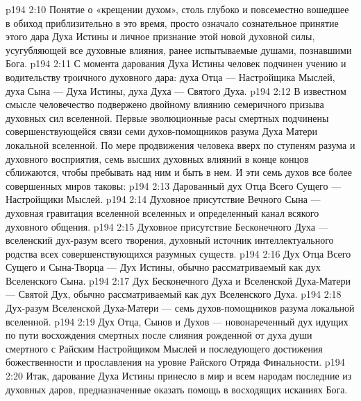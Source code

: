 \vs p194 2:10 \pc Понятие о «крещении духом», столь глубоко и повсеместно вошедшее в обиход приблизительно в это время, просто означало сознательное принятие этого дара Духа Истины и личное признание этой новой духовной силы, усугубляющей все духовные влияния, ранее испытываемые душами, познавшими Бога.
\vs p194 2:11 \pc С момента дарования Духа Истины человек подчинен учению и водительству троичного духовного дара: духа Отца --- Настройщика Мыслей, духа Сына --- Духа Истины, духа Духа --- Святого Духа.
\vs p194 2:12 В известном смысле человечество подвержено двойному влиянию семеричного призыва духовных сил вселенной. Первые эволюционные расы смертных подчинены совершенствующейся связи семи духов\hyp{}помощников разума Духа Матери локальной вселенной. По мере продвижения человека вверх по ступеням разума и духовного восприятия, семь высших духовных влияний в конце концов сближаются, чтобы пребывать над ним и быть в нем. И эти семь духов все более совершенных миров таковы:
\vs p194 2:13 \bibnobreakspace Дарованный дух Отца Всего Сущего --- Настройщики Мыслей.
\vs p194 2:14 \bibnobreakspace Духовное присутствие Вечного Сына --- духовная гравитация вселенной вселенных и определенный канал всякого духовного общения.
\vs p194 2:15 \bibnobreakspace Духовное присутствие Бесконечного Духа --- вселенский дух\hyp{}разум всего творения, духовный источник интеллектуального родства всех совершенствующихся разумных существ.
\vs p194 2:16 \bibnobreakspace Дух Отца Всего Сущего и Сына\hyp{}Творца --- Дух Истины, обычно рассматриваемый как дух Вселенского Сына.
\vs p194 2:17 \bibnobreakspace Дух Бесконечного Духа и Вселенской Духа\hyp{}Матери --- Святой Дух, обычно рассматриваемый как дух Вселенского Духа.
\vs p194 2:18 \bibnobreakspace Дух\hyp{}разум Вселенской Духа\hyp{}Матери --- семь духов\hyp{}помощников разума локальной вселенной.
\vs p194 2:19 \bibnobreakspace Дух Отца, Сынов и Духов --- новонареченный дух идущих по пути восхождения смертных после слияния рожденной от духа души смертного с Райским Настройщиком Мыслей и последующего достижения божественности и прославления на уровне Райского Отряда Финальности.
\vs p194 2:20 \pc Итак, дарование Духа Истины принесло в мир и всем народам последние из духовных даров, предназначенные оказать помощь в восходящих исканиях Бога.
